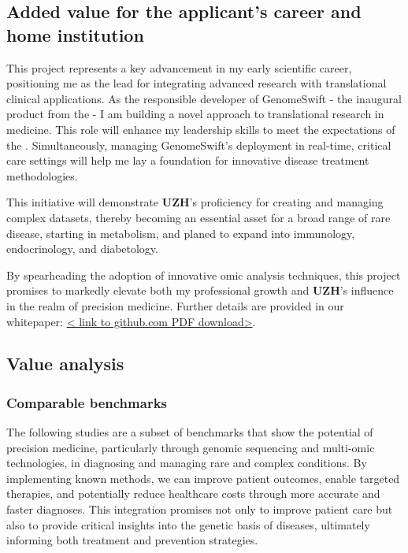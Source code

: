\subsection{Added value for the applicant's career and home institution}
This project represents a key advancement in my early scientific career, positioning me as the lead for integrating advanced research with translational clinical applications. As the responsible developer of GenomeSwift - the inaugural product from the \pmu - I am building a novel approach to translational research in medicine. This role will enhance my leadership skills to meet the expectations of the \pmu. 
Simultaneously, managing GenomeSwift's deployment in real-time, critical care settings will help me lay a foundation for innovative disease treatment methodologies.

This initiative will demonstrate \textbf{UZH}'s proficiency 
for creating and managing complex datasets, thereby becoming an essential asset for a broad range of rare disease, starting in metabolism, and planed to expand into immunology, endocrinology, and diabetology.

By spearheading the adoption of innovative omic analysis techniques, this project promises to markedly elevate both my professional growth and \textbf{UZH}'s influence in the realm of precision medicine.
Further details are provided in our whitepaper: 
\href{https://downgit.github.io/#/home?url=https://github.com/DylanLawless/precision_med_group/blob/main/whitepaper_1/whitepaper_1.1.pdf}{< link to github.com PDF download>}.

\subsection{Value analysis}

\subsubsection{Comparable benchmarks}
\label{sec:benchmarks}

The following studies are a subset of benchmarks that show the potential of precision medicine, particularly through genomic sequencing and multi-omic technologies, in diagnosing and managing rare and complex conditions. 
By implementing known methods, we can improve patient outcomes, enable targeted therapies, and potentially reduce healthcare costs through more accurate and faster diagnoses.
This integration promises not only to improve patient care but also to provide critical insights into the genetic basis of diseases, ultimately informing both treatment and prevention strategies.

